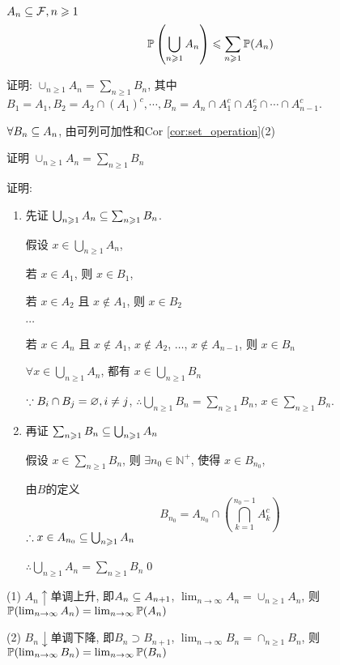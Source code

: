 \begin{property}[次可列可加性]
    $A_n\subseteq \mathcal{F}, n\geqslant 1$
    \[
    \mathbb{P}\left(\bigcup_{n\geqslant 1}A_n\right)\leqslant \sum_{n\geqslant 1}\mathbb{P}(A_n)
    \]
\end{property}

证明: $\cup_{n\geq 1}A_n=\sum_{n\geq 1}B_n$, 其中 $B_1=A_1, B_2=A_2\cap (A_1)^c,\cdots , B_n=A_n\cap A_1^c\cap A_2^c\cap \cdots \cap A_{n-1}^c$.

$\forall B_n\subseteq A_n$, 由可列可加性和Cor \ref{cor:set_operation}(2)

\begin{problem}[作业1-2]\label{exer:disjoint_union}
证明 $\cup_{n\geq 1}A_n=\sum_{n\geq 1}B_n$
\end{problem}

证明: 
\begin{enumerate}
    \item 先证 \(\bigcup_{n \geqslant 1} A_n \subseteq \sum_{n \geqslant 1} B_n\). 

    假设 \(x \in \bigcup_{n \geqslant 1} A_n\), 

    若 \(x \in A_1\), 则 \(x \in B_1\), 

    若 \(x \in A_2\) 且 \(x \notin A_1\), 则 \(x \in B_2\)

    $\cdots$

    若 \(x \in A_n\) 且 \(x \notin A_1\), \(x \notin A_2\), \(\ldots\), \(x \notin A_{n-1}\), 则 \(x \in B_n\)

    $\forall x\in \bigcup_{n\geq 1}A_n$, 都有 $x\in \bigcup_{n\geq 1}B_n$

    \(\because B_i \cap B_j = \varnothing,i\neq j\), \(\therefore \bigcup_{n \geqslant 1} B_n = \sum_{n \geqslant 1} B_n\), \(x \in \sum_{n \geqslant 1} B_n\). 

    \item 再证 \(\sum_{n \geqslant 1} B_n \subseteq \bigcup_{n \geqslant 1} A_n\)

    假设 \(x \in \sum_{n \geqslant 1} B_n\), 则 \(\exists n_0 \in \mathbb{N}^+\), 使得 \(x \in B_{n_0}\), 

    由$B$的定义
    \[
    B_{n_0} = A_{n_0} \cap \left( \bigcap_{k=1}^{n_0-1} A_k^c \right)
    \]
    \(\therefore x \in A_{n_0} \subseteq \bigcup_{n \geqslant 1} A_n\)

    \(\therefore \bigcup_{n \geqslant 1} A_n = \sum_{n \geqslant 1} B_n\)\qed
\end{enumerate}

\begin{property}[连续性]\label{prt:measure_continuity}
    (1) $A_n\uparrow$单调上升, 即$A_n\subseteq A_{n+1}$, $\lim_{n\rightarrow \infty}A_n=\cup_{n\geq 1}A_n$, 则 $\mathbb{P}(\lim_{n\rightarrow \infty}A_n)=\lim_{n\rightarrow \infty}\mathbb{P}(A_n)$

    (2) $B_n\downarrow$单调下降, 即$B_n\supset B_{n+1}$, $\lim_{n\rightarrow \infty}B_n=\cap_{n\geq 1}B_n$, 则 $\mathbb{P}(\lim_{n\rightarrow \infty}B_n)=\lim_{n\rightarrow \infty}\mathbb{P}(B_n)$
\end{property}

